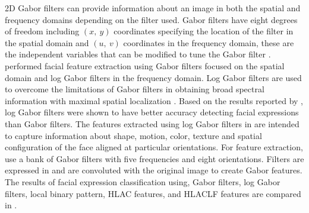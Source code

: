 2D Gabor filters can provide information about an image in both the spatial and frequency domains depending on the filter used. Gabor filters have eight degrees of freedom including $(x,\:y)$ coordinates specifying the location of the filter in the spatial domain and $(u,\:v)$ coordinates in the frequency domain, these are the independent variables that can be modified to tune the Gabor filter \cite{daugman1985uncertainty}. \cite{lajevardi2012automatic} performed facial feature extraction using Gabor filters focused on the spatial domain and log Gabor filters in the frequency domain. Log Gabor filters are used to overcome the limitations of Gabor filters in obtaining broad spectral information with maximal spatial localization \cite{lajevardi2012automatic}. Based on the results reported by \cite{lajevardi2012automatic}, log Gabor filters were shown to have better accuracy detecting facial expressions than Gabor filters.
	The features extracted using log Gabor filters in \cite{lajevardi2012automatic} are intended to capture information about shape, motion, color, texture and spatial configuration of the face aligned at particular orientations. For feature extraction, \cite{lajevardi2012automatic} use a bank of Gabor filters with five frequencies and eight orientations. Filters are expressed in \cite{lajevardi2012automatic} and are convoluted with the original image to create Gabor features. The results of facial expression classification using, Gabor filters, log Gabor filters, local binary pattern, HLAC features, and HLACLF features are compared in \cite{lajevardi2012automatic}.
	



%
%


%


